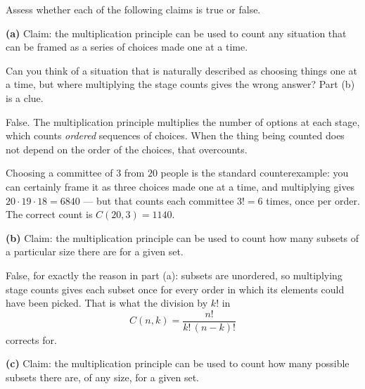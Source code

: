 \documentclass[12pt]{ximera}
\begin{document}
\begin{problem}
Assess whether each of the following claims is true or false.

\begin{prompt}
\textbf{(a)} Claim: the multiplication principle can be used to count any situation
that can be framed as a series of choices made one at a time.

\begin{multipleChoice}
\end{multipleChoice}

\begin{hint}
Can you think of a situation that is naturally described as choosing things one at a
time, but where multiplying the stage counts gives the wrong answer? Part (b) is a
clue.
\end{hint}

\begin{feedback}
False. The multiplication principle multiplies the number of options at each stage,
which counts \emph{ordered} sequences of choices. When the thing being counted does
not depend on the order of the choices, that overcounts.

Choosing a committee of $3$ from $20$ people is the standard counterexample: you can
certainly frame it as three choices made one at a time, and multiplying gives
$20\cdot 19\cdot 18=6840$ --- but that counts each committee $3!=6$ times, once per
order. The correct count is $C(20,3)=1140$.
\end{feedback}
\end{prompt}

\begin{prompt}
\textbf{(b)} Claim: the multiplication principle can be used to count how many
subsets of a particular size there are for a given set.

\begin{multipleChoice}
\end{multipleChoice}

\begin{feedback}
False, for exactly the reason in part (a): subsets are unordered, so multiplying
stage counts gives each subset once for every order in which its elements could have
been picked. That is what the division by $k!$ in
\[ C(n,k)=\frac{n!}{k!\,(n-k)!} \]
corrects for.
\end{feedback}
\end{prompt}

\begin{prompt}
\textbf{(c)} Claim: the multiplication principle can be used to count how many
possible subsets there are, of any size, for a given set.


\end{prompt}
\end{problem}
\end{document}
